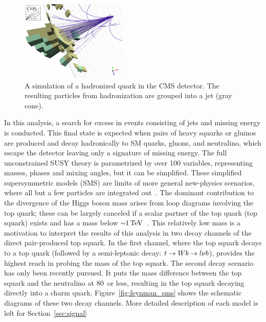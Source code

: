\begin{figure}[h!t]
  \begin{center}
       \includegraphics[width=0.45\textwidth,]{figures/JetConeAndPFJet.png}
       \caption{A simulation of a hadronized quark in the CMS detector. The
       resulting particles from hadronization are grouped into a jet (gray cone). }
    \label{fig:jets}
  \end{center}
\end{figure}

In this analysis, a search for excess in events consisting of jets and 
missing energy is conducted. This final state is expected when pairs of
heavy squarks or gluinos are produced and decay hadronically to SM quarks,
gluons, and neutralino, which escape the detector leaving only a signature
of missing energy.
The full unconstrained SUSY theory is parametrized by over 100 variables, representing 
masses, phases and mixing angles, but it can be simplified. These simplified supersymmetric 
models (SMS) are limits of more general new-physics scenarios, where all but a few 
particles are integrated out~\cite{Alves:2011wf}.
The dominant contribution to the divergence of the Higgs boson mass arises from 
loop diagrams involving the top quark; these can be largely canceled if a scalar 
partner of the top quark (top squark) exists and has a mass below 
$\sim\!\!1\,\text{Te\hspace{-.08em}V}$~\cite{Alves:2011wf}.
This relatively low mass is a motivation to interpret the results of this 
analysis in two decay channels of the direct pair-produced top squark. 
In the first channel, where the top squark decays to a top quark (followed by a 
semi-leptonic decay: $t \rightarrow Wb \rightarrow l \nu b$), provides the highest reach in probing the mass
of the top squark. The second decay scenario has only been recently pursued. It puts 
the mass difference between the top squark and the neutralino at 80~\GeV or 
less, resulting in the top squark decaying directly into a charm quark. 
Figure~\ref{fig:feynman_sms} shows the schematic diagrams of these two decay channels. 
More detailed description of each model is left for Section~\ref{sec:signal}

